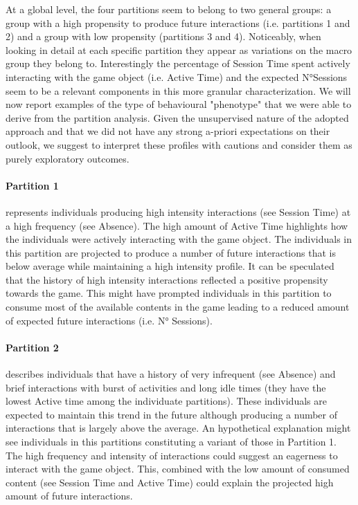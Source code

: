 At a global level, the four partitions seem to belong to two general groups: a group with a high propensity to produce future interactions (i.e. partitions 1 and 2) and a group with low propensity (partitions 3 and 4). Noticeably, when looking in detail at each specific partition they appear as variations on the macro group they belong to. Interestingly the percentage of Session Time spent actively interacting with the game object (i.e. Active Time) and the expected N°Sessions seem to be a relevant components in this more granular characterization. We will now report examples of the type of behavioural "phenotype" that we were able to derive from the partition analysis. Given the unsupervised nature of the adopted approach and that we did not have any strong a-priori expectations on their outlook, we suggest to interpret these profiles with cautions and consider them as purely exploratory outcomes.

\paragraph*{\textbf{Partition 1}} represents individuals producing high intensity interactions (see Session Time) at a high frequency (see Absence). The high amount of Active Time highlights how the individuals were actively interacting with the game object. The individuals in this partition are projected to produce a number of future interactions that is below average while maintaining a high intensity profile. It can be speculated that the history of high intensity interactions reflected a positive propensity towards the game. This might have prompted individuals in this partition to consume most of the available contents in the game leading to a reduced amount of expected future interactions (i.e. N° Sessions).

\paragraph*{\textbf{Partition 2}} describes individuals that have a history of very infrequent (see Absence) and brief interactions with burst of activities and long idle times (they have the lowest Active time among the individuate partitions). These individuals are expected to maintain this trend in the future although producing a number of interactions that is largely above the average. An hypothetical explanation might see individuals in this partitions constituting a variant of those in Partition 1. The high frequency and intensity of interactions could suggest an eagerness to interact with the game object. This, combined with the low amount of consumed content (see Session Time and Active Time) could explain the projected high amount of future interactions.

